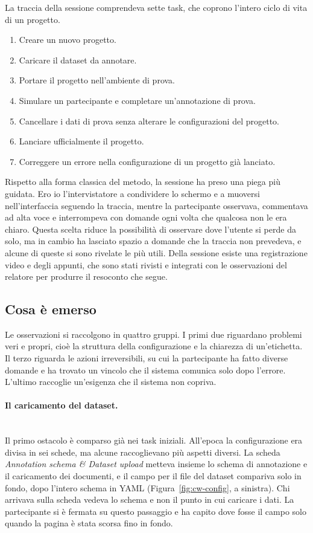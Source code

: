 \documentclass[]{sapthesis}
\begin{document}
La traccia della sessione comprendeva sette task, che coprono l'intero ciclo di vita di un progetto.
\begin{enumerate}
    \item Creare un nuovo progetto.
    \item Caricare il dataset da annotare.
    \item Portare il progetto nell'ambiente di prova.
    \item Simulare un partecipante e completare un'annotazione di prova.
    \item Cancellare i dati di prova senza alterare le configurazioni del progetto.
    \item Lanciare ufficialmente il progetto.
    \item Correggere un errore nella configurazione di un progetto già lanciato.
\end{enumerate}

Rispetto alla forma classica del metodo, la sessione ha preso una piega più guidata. Ero io l'intervistatore a condividere lo schermo e a muoversi nell'interfaccia seguendo la traccia, mentre la partecipante osservava, commentava ad alta voce e interrompeva con domande ogni volta che qualcosa non le era chiaro. Questa scelta riduce la possibilità di osservare dove l'utente si perde da solo, ma in cambio ha lasciato spazio a domande che la traccia non prevedeva, e alcune di queste si sono rivelate le più utili. Della sessione esiste una registrazione video e degli appunti, che sono stati rivisti e integrati con le osservazioni del relatore per produrre il resoconto che segue.

\subsection{Cosa è emerso}
\label{subsec:walkthrough-risultati}

Le osservazioni si raccolgono in quattro gruppi. I primi due riguardano problemi veri e propri, cioè la struttura della configurazione e la chiarezza di un'etichetta. Il terzo riguarda le azioni irreversibili, su cui la partecipante ha fatto diverse domande e ha trovato un vincolo che il sistema comunica solo dopo l'errore. L'ultimo raccoglie un'esigenza che il sistema non copriva.

\paragraph{Il caricamento del dataset.}\mbox{}\\
Il primo ostacolo è comparso già nei task iniziali. All'epoca la configurazione era divisa in sei schede, ma alcune raccoglievano più aspetti diversi. La scheda \emph{Annotation schema \& Dataset upload} metteva insieme lo schema di annotazione e il caricamento dei documenti, e il campo per il file del dataset compariva solo in fondo, dopo l'intero schema in YAML (Figura~\ref{fig:cw-config}, a sinistra). Chi arrivava sulla scheda vedeva lo schema e non il punto in cui caricare i dati. La partecipante si è fermata su questo passaggio e ha capito dove fosse il campo solo quando la pagina è stata scorsa fino in fondo.
\end{document}
